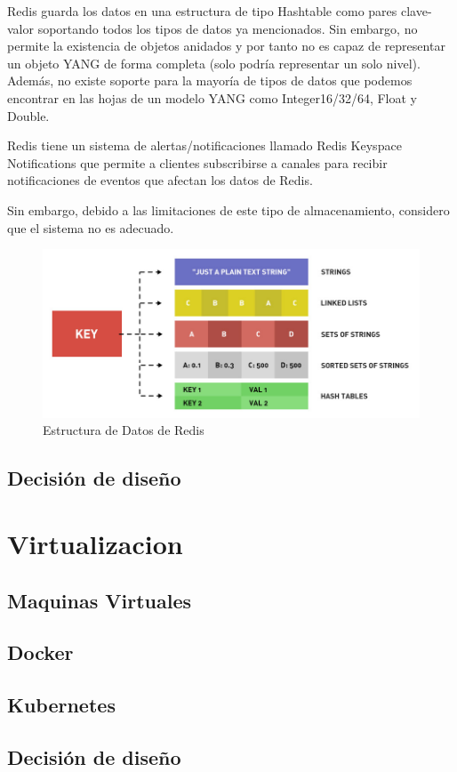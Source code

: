 Redis guarda los datos en una estructura de tipo Hashtable como pares clave-valor soportando todos los
tipos de datos ya mencionados. Sin embargo, no permite la existencia de objetos anidados y por tanto no es capaz de representar un objeto YANG de forma completa (solo podría representar un solo nivel).
Además, no existe soporte para la mayoría de tipos de datos que podemos encontrar en las hojas de un modelo YANG como Integer16/32/64, Float y Double.

Redis tiene un sistema de alertas/notificaciones llamado Redis Keyspace Notifications que permite
a clientes subscribirse a canales para recibir notificaciones de eventos que afectan los datos de Redis. 

Sin embargo, debido a las limitaciones de este tipo de almacenamiento, considero que el sistema no es adecuado.

\begin{figure}
    \centering
    \includegraphics[width=15cm]{graphics/redis-data-structure-types.jpeg}
    \caption{Estructura de Datos de Redis}
    \label{fig:redis_estructura}
\end{figure}

\subsection{Decisión de diseño}





\section{Virtualizacion}
  \subsection{Maquinas Virtuales}
  \subsection{Docker}
  \subsection{Kubernetes}
\subsection{Decisión de diseño}


